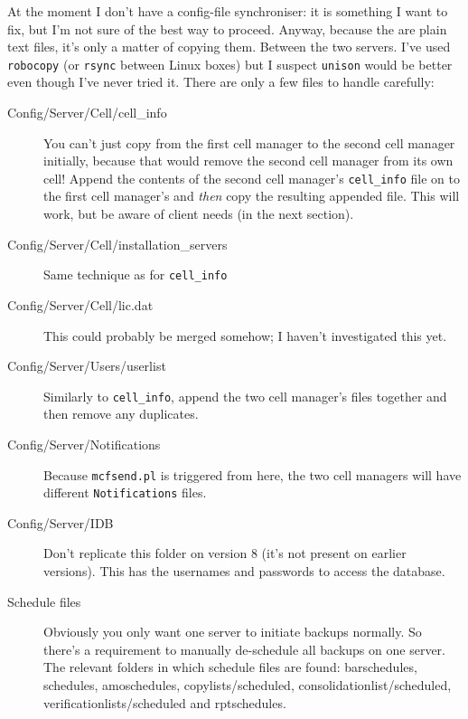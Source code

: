 \documentclass{article}
\begin{document}
At the moment I don't have a config-file synchroniser: it is something I want to fix, but I'm not sure of the best way to proceed. Anyway, because the are plain text files, it's only a matter
of copying them. Between the two servers. I've used {\tt robocopy} (or {\tt rsync} between Linux boxes) but I suspect {\tt unison} would be better even though I've never tried it. There are only a few files to handle carefully:
\begin{description}
\item[Config/Server/Cell/cell\_info] You can't just copy from the first cell manager to the second cell manager initially, because that would remove the second cell manager from its own cell! Append the contents of the second cell manager's {\tt cell\_info} file on to the first cell manager's and {\it then} copy the resulting appended file. This will work, but be aware of client needs (in the next section).
\item[Config/Server/Cell/installation\_servers] Same technique as for {\tt cell\_info}
\item[Config/Server/Cell/lic.dat] This could probably be merged somehow; I haven't investigated this yet.
\item[Config/Server/Users/userlist] Similarly to {\tt cell\_info}, append the two cell manager's files together and then remove any duplicates.
\item[Config/Server/Notifications] Because {\tt mcfsend.pl} is triggered from here, the two cell managers will have different {\tt Notifications} files.
\item[Config/Server/IDB] Don't replicate this folder on version 8 (it's not present on earlier versions). This has the usernames and passwords to access the database.
\item[Schedule files] Obviously you only want one server to initiate backups normally. So there's a requirement to manually de-schedule all backups on one server. The
relevant folders in which schedule files are found: barschedules, schedules, amoschedules, copylists/scheduled, consolidationlist/scheduled, verificationlists/scheduled and rptschedules. 
\end{description}
\end{document}
